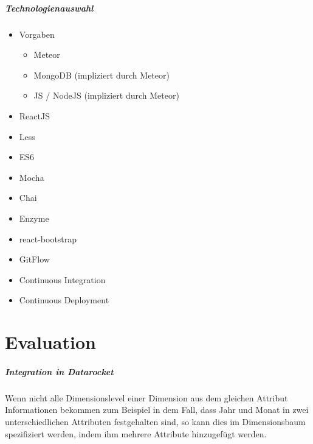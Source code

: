 \documentclass[
  language=german, %
  type=bachelor%
]{isthesis}
\begin{document}
\begin{content}
  \paragraph{Technologienauswahl}
  \begin{itemize}
    \item Vorgaben
      \begin{itemize}
        \item Meteor
        \item MongoDB (impliziert durch Meteor)
        \item JS / NodeJS (impliziert durch Meteor)
      \end{itemize}
    \item ReactJS
    \item Less
    \item ES6
    \item Mocha
    \item Chai
    \item Enzyme
    \item react-bootstrap
  \end{itemize}

  \begin{itemize}
    \item GitFlow
    \item Continuous Integration
    \item Continuous Deployment
  \end{itemize}


\chapter{Evaluation}
 \paragraph{Integration in \textit{Datarocket}}
 Wenn nicht alle Dimensionslevel einer Dimension aus dem gleichen Attribut
 Informationen bekommen zum Beispiel in dem Fall, dass Jahr und Monat in zwei
 unterschiedlichen Attributen festgehalten sind, so kann dies im Dimensionsbaum
 spezifiziert werden, indem ihm mehrere Attribute hinzugefügt werden.

  \begin{figure}[caption={\textit{DataRockets} Datapipeline-Bausteine}, label={}]
  \end{figure}


\end{content}
\end{document}
